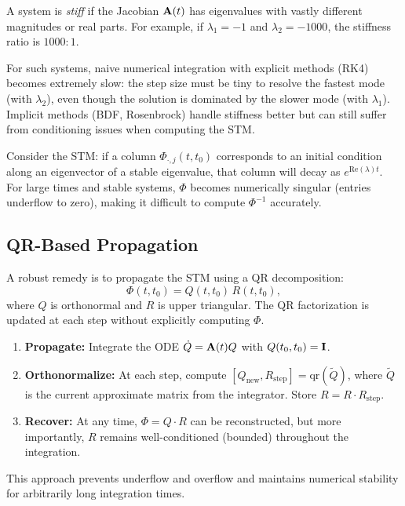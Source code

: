 A system is \emph{stiff} if the Jacobian $\mathbf{A}(t)$ has eigenvalues with vastly different magnitudes
or real parts. For example, if $\lambda_1 = -1$ and $\lambda_2 = -1000$, the stiffness ratio is $1000:1$.

For such systems, naive numerical integration with explicit methods (RK4) becomes extremely slow: the step
size must be tiny to resolve the fastest mode (with $\lambda_2$), even though the solution is dominated
by the slower mode (with $\lambda_1$). Implicit methods (BDF, Rosenbrock) handle stiffness better but can
still suffer from conditioning issues when computing the STM.

Consider the STM: if a column $\Phi_{\cdot,j}(t,t_0)$ corresponds to an initial condition along an
eigenvector of a stable eigenvalue, that column will decay as $e^{\text{Re}(\lambda)t}$. For large times
and stable systems, $\Phi$ becomes numerically singular (entries underflow to zero), making it difficult
to compute $\Phi^{-1}$ accurately.

\subsection{QR-Based Propagation}

A robust remedy is to propagate the STM using a QR decomposition:
\begin{equation}
\Phi(t,t_0) = Q(t,t_0)\,R(t,t_0),
\label{eq:ch2:qr-stm}
\end{equation}
where $Q$ is orthonormal and $R$ is upper triangular. The QR factorization is updated at each step
without explicitly computing $\Phi$.

\begin{enumerate}
\item \textbf{Propagate:} Integrate the ODE $\dot Q = \mathbf{A}(t)Q$ with $Q(t_0,t_0) = \mathbf{I}$.
\item \textbf{Orthonormalize:} At each step, compute $[Q_{\text{new}}, R_{\text{step}}] = \text{qr}(\tilde{Q})$,
      where $\tilde{Q}$ is the current approximate matrix from the integrator. Store $R = R \cdot R_{\text{step}}$.
\item \textbf{Recover:} At any time, $\Phi = Q \cdot R$ can be reconstructed, but more importantly, $R$ remains
      well-conditioned (bounded) throughout the integration.
\end{enumerate}

This approach prevents underflow and overflow and maintains numerical stability for arbitrarily long integration times.

